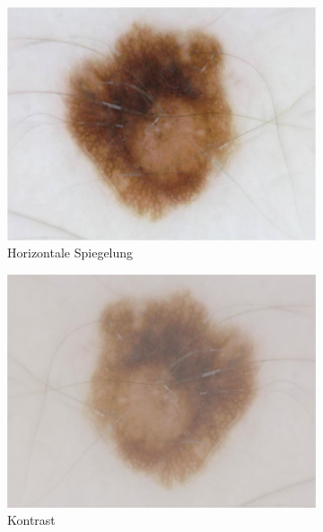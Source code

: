 \begin{figure}[t]
\begin{subfigure}[t]{0.24\linewidth}
		\includegraphics[width=\textwidth]{./pics/augmentations/horizontal_flip.png}
		\caption{Horizontale Spiegelung}
		\label{subfig:aug_h_flip}
	\end{subfigure}
	\begin{subfigure}[t]{0.24\linewidth}
		\includegraphics[width=\textwidth]{./pics/augmentations/contrast.png}
		\caption{Kontrast}
		\label{subfig:aug_contrast}
	\end{subfigure}
	\begin{subfigure}[t]{0.24\linewidth}

\end{subfigure}
\end{figure}
